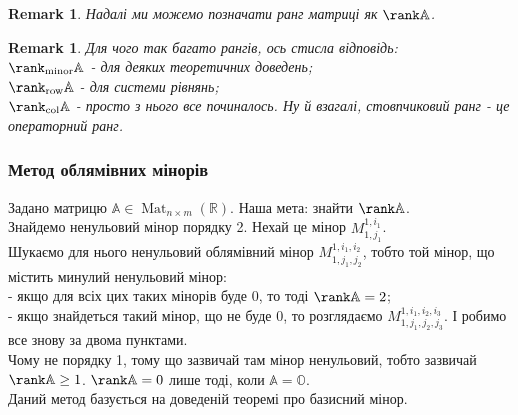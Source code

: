\documentclass[a4paper, 10pt]{article}
\theoremstyle{theoremdd}
\newtheorem{remark}[theorem]{Remark}
\DeclareMathOperator{\Mat}{Mat}
\begin{document}
\begin{remark}
Надалі ми можемо позначати ранг матриці як $\rank \mathbb{A}$.
\end{remark}

\begin{remark}
Для чого так багато рангів, ось стисла відповідь:\\
$\rank_{\textrm{minor}} \mathbb{A}$ - для деяких теоретичних доведень;\\
$\rank_{\textrm{row}} \mathbb{A}$ - для системи рівнянь;\\
$\rank_{\textrm{col}} \mathbb{A}$ - просто з нього все починалось. Ну й взагалі, стовпчиковий ранг - це операторний ранг.
\end{remark}

\subsubsection*{Метод облямівних мінорів}
Задано матрицю $\mathbb{A} \in \Mat_{n \times m}(\mathbb{R})$. Наша мета: знайти $\rank \mathbb{A}$.\\
Знайдемо ненульовий мінор порядку 2. Нехай це мінор $M_{1,j_1}^{1,i_1}$.\\
Шукаємо для нього ненульовий облямівний мінор $M_{1,j_1,j_2}^{1,i_1,i_2}$, тобто той мінор, що містить минулий ненульовий мінор:\\
- якщо для всіх цих таких мінорів буде 0, то тоді $\rank \mathbb{A} = 2$;\\
- якщо знайдеться такий мінор, що не буде 0, то розглядаємо $M_{1,j_1,j_2,j_3}^{1,i_1,i_2,i_3}$. І робимо все знову за двома пунктами.
\bigskip \\
Чому не порядку 1, тому що зазвичай там мінор ненульовий, тобто зазвичай $\rank \mathbb{A} \geq 1$. $\rank \mathbb{A} = 0$ лише тоді, коли $\mathbb{A} = \mathbb{O}$.
\bigskip \\
Даний метод базується на доведеній теоремі про базисний мінор.
\end{document}
